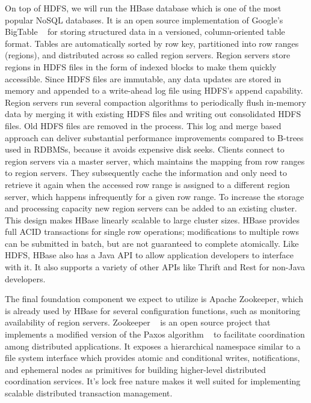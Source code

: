 \documentclass[10pt,final,journal]{IEEEtran}
\begin{document}
On top of HDFS, we will run the HBase database which is one of the most popular NoSQL databases. It is an open source implementation of Google's BigTable ~\cite{Chang:2006:BDS:1267308.1267323} for storing structured data in a versioned, column-oriented table format. Tables are automatically sorted by row key, partitioned into row ranges (regions), and distributed across so called region servers. Region servers store regions in HDFS files in the form of indexed blocks to make them quickly accessible. Since HDFS files are immutable, any data updates are stored in memory and appended to a write-ahead log file using HDFS's append capability. Region servers run several compaction algorithms to periodically flush in-memory data by merging it with existing HDFS files and writing out consolidated HDFS files. Old HDFS files are removed in the process. This log and merge based approach can deliver substantial performance improvements compared to B-trees used in RDBMSs, because it avoids expensive disk seeks. Clients connect to region servers via a master server, which maintains the mapping from row ranges to region servers. They subsequently cache the information and only need to retrieve it again when the accessed row range is assigned to a different region server, which happens infrequently for a given row range. To increase the storage and processing capacity new region servers can be added to an existing cluster. This design makes HBase linearly scalable to large cluster sizes. HBase provides full ACID transactions for single row operations; modifications to multiple rows can be submitted in batch, but are not guaranteed to complete atomically. Like HDFS, HBase also has a Java API to allow application developers to interface with it.  It also supports a variety of other APIs like Thrift and Rest for non-Java developers.

The final foundation component we expect to utilize is Apache Zookeeper, which is already used by HBase for several configuration functions, such as monitoring availability of region servers. Zookeeper ~\cite{Hunt:2010:ZWC:1855840.1855851} is an open source project that implements a modified version of the Paxos algorithm ~\cite{Lamport:1998:PP:279227.279229, Lamport:2001:PMS} to facilitate coordination among distributed applications. It exposes a hierarchical namespace similar to a file system interface which provides atomic and conditional writes, notifications, and ephemeral nodes as primitives for building higher-level distributed coordination services. It's lock free nature makes it well suited for implementing scalable distributed transaction management.
\end{document}
